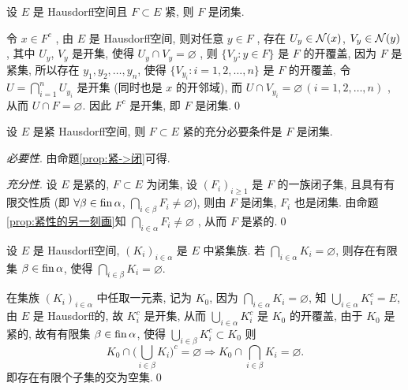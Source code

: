      \begin{Proposition}\label{prop:紧->闭}
          设 $ E $ 是 Hausdorff空间且 $ F\subset E $ 紧, 则 $ F $ 是闭集. 
     \end{Proposition}

     \begin{Proof}
          令 $ x\in F^{c} $ , 由 $ E $ 是 Hausdorff空间, 则对任意 $  y\in F $ , 存在 $ U_{y}\in\mathcal{N}(x) $, $ V_{y}\in\mathcal{N}(y) $ , 其中 $ U_{y} $, $ V_{y} $ 是开集, 使得 $ U_{y}\cap V_{y}=\varnothing $ , 则 $\{ V_{y}:y\in F \}$ 是 $ F $ 的开覆盖, 因为 $ F $ 是紧集, 所以存在 $ y_{1}, y_{2}, \dots, y_{n} $, 使得 $ \{ V_{y_{i}}: i=1, 2, \dots, n \} $ 是 $ F $ 的开覆盖, 令 $ U=\bigcap_{i=1}^{n}U_{y_{i}} $ 是开集 (同时也是 $ x $ 的开邻域), 而 $ U\cap V_{y_{i}}=\varnothing\,(i=1, 2, \dots, n) $ , 从而 $ U\cap F=\varnothing $. 因此 $ F^{c} $ 是开集, 即 $ F $ 是闭集.\qed
     \end{Proof}

     \begin{Proposition}
          设 $ E $ 是紧 Hausdorff空间, 则 $ F\subset E $ 紧的充分必要条件是 $ F $ 是闭集. 
     \end{Proposition}
     
     \begin{Proof}
          \textsl{必要性}. 由命题\ref{prop:紧->闭}可得.

          \textsl{充分性}. 设 $ E $ 是紧的, $ F\subset E $ 为闭集, 设 $ (F_{i})_{i\geqslant1} $ 是 $ F $ 的一族闭子集, 且具有有限交性质 (即 $ \forall \beta\in\operatorname{fin}\alpha $, $ \bigcap_{i\in\beta}F_{i}\neq\varnothing $), 则由 $ F $ 是闭集,  $ F_{i} $ 也是闭集. 由命题\ref{prop:紧性的另一刻画}知 $ \bigcap_{i\in\alpha}F_{i}\neq\varnothing $ , 从而 $ F $ 是紧的.\qed
     \end{Proof}

     \begin{Proposition}
          设 $ E $ 是 Hausdorff空间,  $ (K_{i})_{i\in\alpha} $ 是 $ E $ 中紧集族. 若 $ \bigcap_{i\in\alpha}K_{i}=\varnothing $, 则存在有限集 $ \beta\in\operatorname{fin}\alpha $, 使得 $ \bigcap_{i\in\beta}K_{i}=\varnothing $.   
     \end{Proposition}
     
     \begin{Proof}
          在集族 $ (K_{i})_{i\in\alpha} $ 中任取一元素, 记为 $ K_{0} $, 因为 $ \bigcap_{i\in\alpha}K_{i}=\varnothing $, 
          知 $ \bigcup_{i\in\alpha}K_{i}^{c}=E $, 由 $ E $ 是 Hausdorff的, 故 $ K_{i}^{c} $ 是开集, 从而 $ \bigcup_{i\in\alpha}K_{i}^{c} $ 是 $ K_{0} $ 的开覆盖, 由于 $ K_{0} $ 是紧的, 故有有限集 $ \beta\in\operatorname{fin}\alpha $, 使得 $ \bigcup_{i\in\beta}K_{i}^{c}\subset K_{0} $ 则
          \[
               K_{0}\cap \bigg( \bigcup_{i\in\beta}K_{i} \bigg)^{c}=\varnothing \Rightarrow K_{0}\cap\bigcap_{i\in\beta}K_{i}=\varnothing.
          \]
          即存在有限个子集的交为空集.\qed
     \end{Proof}

